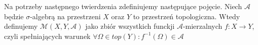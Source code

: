 \begin{defi}
    Na potrzeby następnego twierdzenia zdefiniujemy następujące pojęcie. Niech $\mathcal{A}$ będzie
    $\sigma$-algebrą na przestrzeni $X$ oraz $Y$ to przestrzeń topologiczna. Wtedy definujemy $\mathcal{M}(X,Y,\mathcal{A})$
    jako zbiór wszystkich funckji $\mathcal{A}$-mierzalnych $f:X \rightarrow Y$, czyli
    spełniających warunek $\forall \Omega \in top(Y): f^{-1}(\Omega) \in \mathcal{A}$
\end{defi}